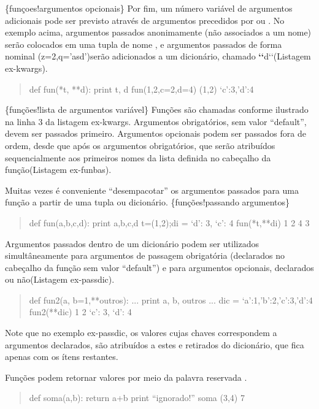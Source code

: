 \documentclass[a4paper,10pt,portuguese]{sphinxmanual}
\begin{document}
\{funçoes!argumentos opcionais\} Por fim, um número variável de
argumentos adicionais pode ser previsto através de argumentos
precedidos por \code{*} ou \code{**}. No exemplo acima, argumentos
passados anonimamente (não associados a um nome) serão colocados em
uma tupla de nome , e argumentos passados de forma nominal
(z=2,q='asd')serão adicionados a um dicionário, chamado
{\color{red}\bfseries{}{}`{}`}d{}`{}`(Listagem ex-kwargs).
\begin{quote}

def fun(*t, **d): print t, d fun(1,2,c=2,d=4) (1,2)
`c':3,'d':4
\end{quote}

\{funções!lista de argumentos variável\} Funções são chamadas
conforme ilustrado na linha 3 da listagem ex-kwargs. Argumentos
obrigatórios, sem valor ``default'', devem ser passados primeiro.
Argumentos opcionais podem ser passados fora de ordem, desde que
após os argumentos obrigatórios, que serão atribuídos
sequencialmente aos primeiros nomes da lista definida no cabeçalho
da função(Listagem ex-funbas).

Muitas vezes é conveniente ``desempacotar'' os argumentos passados
para uma função a partir de uma tupla ou dicionário.
\{funções!passando argumentos\}
\begin{quote}

def fun(a,b,c,d): print a,b,c,d t=(1,2);di = `d': 3, `c': 4
fun(*t,**di) 1 2 4 3
\end{quote}

Argumentos passados dentro de um dicionário podem ser utilizados
simultâneamente para argumentos de passagem obrigatória (declarados
no cabeçalho da função sem valor ``default'') e para argumentos
opcionais, declarados ou não(Listagem ex-passdic).
\begin{quote}

def fun2(a, b=1,**outros): ... print a, b, outros ... dic =
`a':1,'b':2,'c':3,'d':4 fun2(**dic) 1 2 `c': 3, `d': 4
\end{quote}

Note que no exemplo ex-passdic, os valores cujas chaves
correspondem a argumentos declarados, são atribuídos a estes e
retirados do dicionário, que fica apenas com os ítens restantes.

Funções podem retornar valores por meio da palavra reservada
.
\begin{quote}

def soma(a,b): return a+b print ``ignorado!'' soma (3,4) 7
\end{quote}
\end{document}
